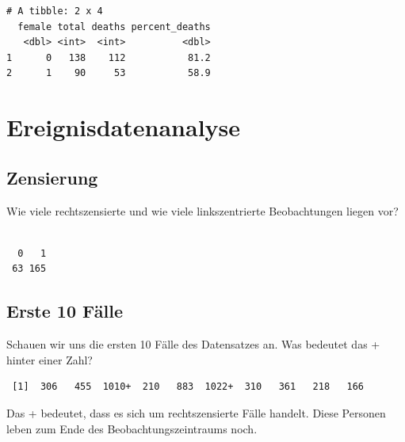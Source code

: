 \documentclass[
  letterpaper,
  DIV=11,
  numbers=noendperiod]{scrartcl}
\newenvironment{Shaded}{\begin{snugshade}}{\end{snugshade}}
\newcommand{\DecValTok}[1]{\textcolor[rgb]{0.68,0.00,0.00}{#1}}
\newcommand{\FunctionTok}[1]{\textcolor[rgb]{0.28,0.35,0.67}{#1}}
\newcommand{\NormalTok}[1]{\textcolor[rgb]{0.00,0.23,0.31}{#1}}
\newcommand{\SpecialCharTok}[1]{\textcolor[rgb]{0.37,0.37,0.37}{#1}}
\begin{document}
\begin{verbatim}
# A tibble: 2 x 4
  female total deaths percent_deaths
   <dbl> <int>  <int>          <dbl>
1      0   138    112           81.2
2      1    90     53           58.9
\end{verbatim}

\section{Ereignisdatenanalyse}\label{ereignisdatenanalyse}

\subsection{Zensierung}\label{zensierung}

Wie viele rechtszensierte und wie viele linkszentrierte Beobachtungen
liegen vor?

\begin{Shaded}
\end{Shaded}

\begin{verbatim}

  0   1 
 63 165 
\end{verbatim}

\subsection{Erste 10 Fälle}\label{erste-10-fuxe4lle}

Schauen wir uns die ersten 10 Fälle des Datensatzes an. Was bedeutet das
+ hinter einer Zahl?

\begin{Shaded}
\end{Shaded}

\begin{verbatim}
 [1]  306   455  1010+  210   883  1022+  310   361   218   166 
\end{verbatim}

Das + bedeutet, dass es sich um rechtszensierte Fälle handelt. Diese
Personen leben zum Ende des Beobachtungszeintraums noch.
\end{document}
